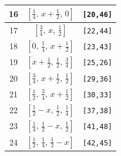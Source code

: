 \documentclass[fleqn,8pt]{jsarticle}
\begin{document}
\begin{longtable}{ccc}
16 & $\left[ \frac{1}{4},\, x + \frac{1}{2},\, 0 \right]$ & {\tt [20,46]} \\ \hline
17 & $\left[ \frac{3}{4},\, x,\, \frac{1}{2} \right]$ & {\tt [22,44]} \\ \hline
18 & $\left[ 0,\, \frac{1}{4},\, x + \frac{1}{2} \right]$ & {\tt [23,43]} \\ \hline
19 & $\left[ x + \frac{1}{2},\, \frac{1}{2},\, \frac{3}{4} \right]$ & {\tt [25,26]} \\ \hline
20 & $\left[ \frac{3}{4},\, x + \frac{1}{2},\, \frac{1}{2} \right]$ & {\tt [29,36]} \\ \hline
21 & $\left[ \frac{1}{2},\, \frac{3}{4},\, x + \frac{1}{2} \right]$ & {\tt [30,33]} \\ \hline
22 & $\left[ \frac{1}{2} - x,\, \frac{1}{2},\, \frac{1}{4} \right]$ & {\tt [37,38]} \\ \hline
23 & $\left[ \frac{1}{4},\, \frac{1}{2} - x,\, \frac{1}{2} \right]$ & {\tt [41,48]} \\ \hline
24 & $\left[ \frac{1}{2},\, \frac{1}{4},\, \frac{1}{2} - x \right]$ & {\tt [42,45]} \\
\end{longtable}
\renewcommand{\arraystretch}{1.2}
\end{document}
